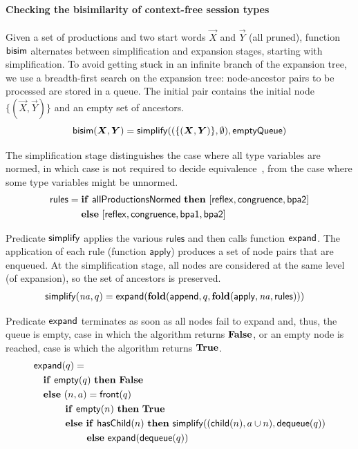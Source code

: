 \paragraph{Checking the bisimilarity of context-free session types}

Given a set of productions and two start words $\vec X$ and $\vec Y$
(all pruned), function $\mathsf{bisim}$ alternates between simplification and
expansion stages, starting with simplification.
%
To avoid getting stuck in an infinite branch of the expansion tree, we
use a breadth-first search on the expansion tree: node-ancestor pairs
to be processed are stored in a queue. The initial pair contains the
initial node $\{(\vec X,\vec Y)\}$ and an empty set of ancestors.
%
\begin{equation*}
  \Bisim(\vec X, \vec Y) = \simplify((\{(\vec X,\vec Y)\},\emptyset), \mathsf{emptyQueue})
\end{equation*}

The simplification stage distinguishes the case where all type
variables are normed, in which case  is not required to decide
equivalence~\cite{caucal1986decidabilite,DBLP:journals/iandc/ChristensenHS95},
from the case where some type variables might be unnormed.
%
\begin{align*}
  \mathsf{rules} =\;& \mathbf{if}\ \mathsf{allProductionsNormed}\ \mathbf{then}\
  [\mathsf{reflex} ,\mathsf{congruence}, \mathsf{bpa2}]\\
  &\mathbf{else}\ [\mathsf{reflex} ,\mathsf{congruence}, \mathsf{bpa1} , \mathsf{bpa2}]
\end{align*}

Predicate $\mathsf{simplify}$ applies the various $\mathsf{rules}$ and then
calls function $\mathsf{expand}$.
%
The application of each rule (function $\mathsf{apply}$) produces a
set of node pairs that are enqueued. At the simplification stage,
all nodes are considered at the same level (of expansion), so the
set of ancestors is preserved.
%
\begin{align*}
  &\mathsf{simplify}(\mathit{na}, q) = \mathsf{expand}(\mathbf{fold}(\mathsf{append}, q,
    \mathbf{fold}(\mathsf{apply}, \mathit{na}, \mathsf{rules})))
\end{align*}

Predicate $\mathsf{expand}$ terminates as soon as all nodes fail to expand
and, thus, the queue is empty, case in which the algorithm returns
$\mathbf{False}$, or an empty node is reached, case is which the algorithm
returns $\mathbf{True}$.
%
\begin{align*}
  &\mathsf{expand}(q) =\\
  &\quad \mathbf{if}\ \mathsf{empty}(q)\ \mathbf{then}\ \mathbf{False}\\
  &\quad \mathbf{else}\ (n,a) = \mathsf{front}(q)\\
  & \qquad\quad\; \mathbf{if}\ \mathsf{empty}(n)\ \mathbf{then}\ \mathbf{True}\\
  & \qquad\quad\; \mathbf{else}\ \mathbf{if}\ \mathsf{hasChild}(n)\ \mathbf{then}\
    \mathsf{simplify}((\mathsf{child}(n), a \cup n), \mathsf{dequeue}(q))\\
  & \qquad\qquad\quad\;\: \mathbf{else}\ \mathsf{expand}(\mathsf{dequeue}(q))
\end{align*}

